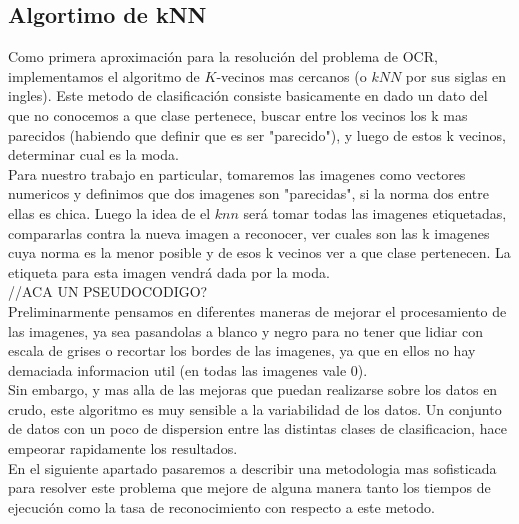 \subsection{Algortimo de kNN}
Como primera aproximaci\'on para la resoluci\'on del problema de OCR, implementamos el algoritmo de $K$-vecinos mas cercanos (o $kNN$ por sus siglas en ingles). Este metodo de clasificación consiste basicamente en dado un dato del que no conocemos a que clase pertenece, buscar entre los vecinos los k mas parecidos (habiendo que definir que es ser "parecido"), y luego de estos k vecinos, determinar cual es la moda. 
\\
Para nuestro trabajo en particular, tomaremos las imagenes como vectores numericos y definimos que dos imagenes son "parecidas", si la norma dos entre ellas es chica. Luego la idea de el $knn$ será tomar todas las imagenes etiquetadas, compararlas contra la nueva imagen a reconocer, ver cuales son las k imagenes cuya norma es la menor posible y de esos k vecinos ver a que clase pertenecen. La etiqueta para esta imagen vendrá dada por la moda. 
\\
//ACA UN PSEUDOCODIGO?
\\
Preliminarmente pensamos en diferentes maneras de mejorar el procesamiento de las imagenes, ya sea pasandolas a blanco y negro para no tener que lidiar con escala de grises o recortar los bordes de las imagenes, ya que en ellos no hay demaciada informacion util (en todas las imagenes vale 0).
\\
Sin embargo, y mas alla de las mejoras que puedan realizarse sobre los datos en crudo, este algoritmo es muy sensible a la variabilidad de los datos. Un conjunto de datos con un poco de dispersion entre las distintas clases de clasificacion, hace empeorar rapidamente los resultados.
\\
En el siguiente apartado pasaremos a describir una metodologia mas sofisticada para resolver este problema que mejore de alguna manera tanto los tiempos de ejecución como la tasa de reconocimiento con respecto a este metodo.

